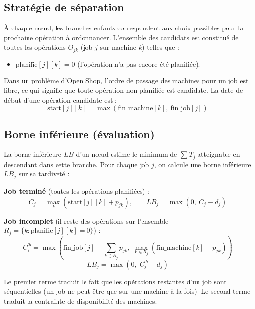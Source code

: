\subsection{Stratégie de séparation}

À chaque n\oe ud, les branches enfants correspondent aux choix possibles pour la prochaine opération à ordonnancer. L'ensemble des candidats est constitué de toutes les opérations $O_{jk}$ (job $j$ sur machine $k$) telles que :
\begin{itemize}
    \item $\text{planifie}[j][k] = 0$ (l'opération n'a pas encore été planifiée).
\end{itemize}

Dans un problème d'Open Shop, l'ordre de passage des machines pour un job est libre, ce qui signifie que toute opération non planifiée est candidate. La date de début d'une opération candidate est :
\begin{equation}
    \text{start}[j][k] = \max(\text{fin\_machine}[k],\; \text{fin\_job}[j])
\end{equation}

\subsection{Borne inférieure (évaluation)}

La borne inférieure $LB$ d'un n\oe ud estime le minimum de $\sum T_j$ atteignable en descendant dans cette branche. Pour chaque job $j$, on calcule une borne inférieure $LB_j$ sur sa tardiveté :

\textbf{Job terminé} (toutes les opérations planifiées) :
\begin{equation}
    C_j = \max_{k} \left( \text{start}[j][k] + p_{jk} \right), \qquad LB_j = \max(0,\; C_j - d_j)
\end{equation}

\textbf{Job incomplet} (il reste des opérations sur l'ensemble $R_j = \{k : \text{planifie}[j][k] = 0\}$) :
\begin{equation}
    C_j^{lb} = \max\left(
        \text{fin\_job}[j] + \sum_{k \in R_j} p_{jk},\;
        \max_{k \in R_j} \left( \text{fin\_machine}[k] + p_{jk} \right)
    \right)
\end{equation}
\begin{equation}
    LB_j = \max(0,\; C_j^{lb} - d_j)
\end{equation}

Le premier terme traduit le fait que les opérations restantes d'un job sont séquentielles (un job ne peut être que sur une machine à la fois). Le second terme traduit la contrainte de disponibilité des machines.


